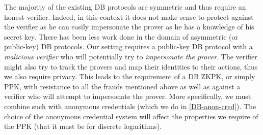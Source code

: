 The majority of the existing \ac{DB} protocols are symmetric and thus require an honest verifier.
Indeed, in this context it does not make sense to protect against the verifier as he can easily impersonate the prover as he has a knowledge of his secret key.
There has been less work done in the domain of asymmetric (or public-key) \ac{DB} protocols.
Our setting requires a public-key \ac{DB} protocol with a \emph{malicious verifier} who will potentially try to \emph{impersonate the prover}.
The verifier might also try to track the provers and map their identities to their actions, thus we also require privacy.
This leads to the requirement of a \ac{DB} \ac{ZKPK}, or simply \ac{PPK}, with resistance to all the frauds mentioned above as well as against a verifier who will attempt to impersonate the prover.
More specifically, we must combine such  with anonymous credentials 
(which we do in \cref{DB-anon-cred}).
The choice of the anonymous credential system will affect the properties we 
require of the \ac{PPK} (\eg that it must be  for discrete logarithms).
